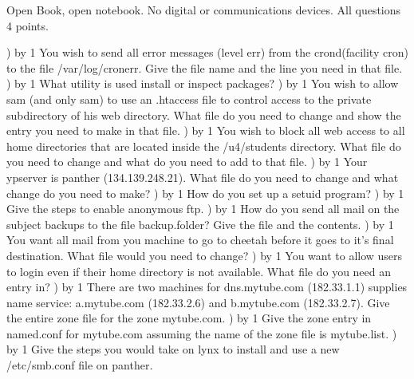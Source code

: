 
\parindent=0in
\nopagenumbers
\newcount\quesno
{}
\def\ques{\number\quesno) \advance\quesno by 1}
\def\aspace{\vskip 1.5in}

Open Book, open notebook. No digital or communications devices.
All questions 4 points.

\ques
You wish to send all error messages (level {\ltt{}err})
from the {\ltt{}crond}(facility {\ltt{}cron})
to the file {\ltt{}/var/log/cronerr}.
Give the file name and the line you need in that file.
\vskip 1.0in
\ques
What utility is used install or inspect packages?
\vskip 0.8in
\ques
You wish to allow sam (and only sam) to use an {\ltt{}.htaccess} file to
control access to the {\ltt{}private} subdirectory of his web directory.
What file do you need to change and show the entry you need to make in that
file.
\vskip 2.8in
\ques
You wish to block all web access to all home directories that are located
inside the {\ltt{}/u4/students} directory.
What file do you need to change and what do you need to add to that file.
\vskip 2.3in
\vfill\eject
\ques
Your ypserver is {\ltt{}panther} ({\ltt{}134.139.248.21}).
What file do you need to change and what change do you need to make?
\vskip 1.0in
\ques
How do you set up a setuid program?
\vskip 1.5in
\ques
Give the steps to enable anonymous ftp.
\vskip 1.3in
\ques
How do you send all mail on the subject {\ltt{}backups} to
the file {\ltt{}backup.folder}?
Give the file and the contents.
\vskip 1.6in
\vfill\eject
\ques
You want all mail from you machine to go to {\ltt{}cheetah}
before it goes to it's final destination.
What file would you need to change?
\vskip 0.6in
\ques
You want to allow users to login even if their home directory
is not available.
What file do you need an entry in?
\vskip 0.6in
\ques
There are two machines for {\ltt{}dns.mytube.com} ({\ltt{}182.33.1.1})
supplies name service:
{\ltt{}a.mytube.com} ({\ltt{}182.33.2.6}) and 
{\ltt{}b.mytube.com} ({\ltt{}182.33.2.7}).
Give the entire zone file for the zone {\ltt{}mytube.com}.
\vskip 4.3in
\ques
Give the zone entry in {\ltt{}named.conf}
for {\ltt{}mytube.com} assuming
the name of the zone file is {\ltt{}mytube.list}.
\vfill\eject
\ques
Give the steps you would take on {\ltt{}lynx} to install and use
a new {\ltt{}/etc/smb.conf} file on {\ltt{}panther}.
